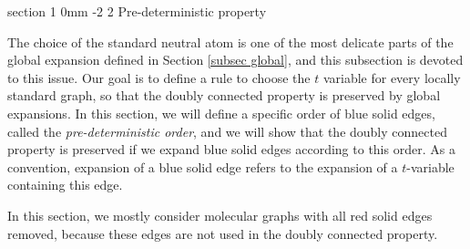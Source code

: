 \documentclass{article}
\makeatletter
\newcommand{\1}{\mathds{1}}
\numberwithin{equation}{section}
\theoremstyle{plain} %
\theoremstyle{remark}
\newcommand{\cor}{\color{red}}
\renewcommand{\section}{\@startsection
	{section}%
	{1}%
	{0mm}%
	{-2\baselineskip}%
	{2\baselineskip}%
	{\normalfont\large\scshape\centering}} %
\newcommand{\hty}[1]{{\cor (ht: #1) }}
\makeatother
\begin{document}
 
  
 \section{Pre-deterministic property}\label{sec pre}



The choice of the standard neutral atom is one of the most delicate parts of the global expansion defined in Section \ref{subsec global}, and this subsection is devoted to this issue. Our goal is to define a rule to choose the $t$ variable for every locally standard graph, so that the  doubly connected property is preserved by global expansions. In this section, we will define a specific order of blue solid edges, called the \emph{pre-deterministic order}, and we will show that the doubly connected property is preserved if we expand blue solid edges according to this order. 
As a convention, expansion of a blue solid edge refers to the expansion of a $t$-variable containing this edge.

In this section, we mostly consider molecular graphs with all red solid edges removed, because these edges are not used in the doubly connected property.
\end{document}
